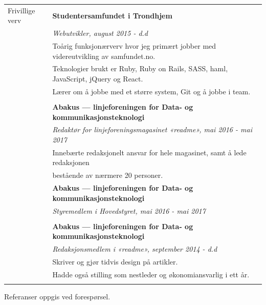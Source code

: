 \documentclass[letterpaper,11pt,oneside]{article}
\begin{document}
\begin{longtable}{@{} l l}
 \Large{Frivillige verv}    & \textbf{Studentersamfundet i Trondhjem} \\
 & \textit{Webutvikler, august 2015 - d.d}\\
     & Toårig funksjonærverv hvor jeg primært jobber med videreutvikling av samfundet.no. \\
     & Teknologier brukt er Ruby, Ruby on Rails, SASS, haml, JavaScript, jQuery og React. \\
     & Lærer om å jobbe med et større system, Git og å jobbe i team.\\
     & \\
     & \textbf{Abakus --- linjeforeningen for Data- og kommunikasjonsteknologi} \\
     & \textit{Redaktør for linjeforeningsmagasinet «readme», mai 2016 - mai 2017}\\
     & Innebærte redaksjonelt ansvar for hele magasinet, samt å lede redaksjonen \\
     & bestående av nærmere 20 personer.
     & \\
     & \textbf{Abakus --- linjeforeningen for Data- og kommunikasjonsteknologi} \\
     & \textit{Styremedlem i Hovedstyret, mai 2016 - mai 2017}\\
     & \\
     & \textbf{Abakus --- linjeforeningen for Data- og kommunikasjonsteknologi} \\
     & \textit{Redaksjonsmedlem i «readme», september 2014 - d.d}\\
     & Skriver og gjør tidvis design på artikler. \\
     & Hadde også stilling som nestleder og økonomiansvarlig i ett år.\\
     & \\

\end{longtable}

Referanser oppgis ved forespørsel.
\end{document}
